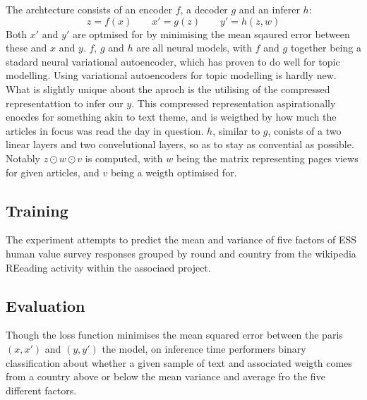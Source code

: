 The archtecture consists of an encoder $f$, a decoder $g$ and an inferer $h$:
$$
z  = f(x) \qquad
x' = g(z) \qquad
y' = h(z, w)
$$
Both $x'$ and $y'$ are optmised for by minimising the mean sqaured error between these and $x$ and $y$.
$f$, $g$ and $h$ are all neural models, with $f$ and $g$ together being a stadard neural variational autoencoder, which has proven to do well for topic modelling.
Using variational autoencoders for topic modelling is hardly new. What is slightly unique about the aproch is the utilising of the compressed representattion to infer our $y$.
This compressed representation aspirationally enocdes for something akin to text theme, and is weigthed by how much the articles in focus was read the day in question.
$h$, similar to $g$, conists of a two linear layers and two convelutional layers, so as to stay as convential as possible.
Notably $z \odot w \odot v$ is computed, with $w$ being the matrix representing pages views for given articles, and $v$ being a weigth optimised for.


\subsection*{Training}

The experiment attempts to predict the mean and variance of five factors of ESS human value survey responses grouped by round and country from the wikipedia REeading activity within the associaed project.

\subsection*{Evaluation}
Though the loss function minimises the mean squared error between the paris $(x, x')$ and $(y, y')$ the model, on inference time performers binary classification about whether a given sample of text and associated weigth comes from a country above or below the mean variance and average fro the five different factors.
